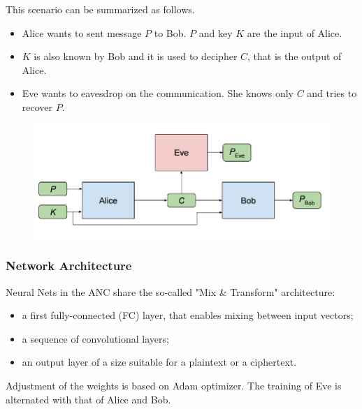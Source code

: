 \documentclass{beamer}
\begin{document}
\begin{frame}
This scenario can be summarized as follows.
\begin{itemize}
\item Alice wants to sent message $P$ to Bob. $P$ and key $K$ are the input of Alice. 
\item $K$ is also known by Bob and it is used to decipher $C$, that is the output of Alice.
\item Eve wants to eavesdrop on the communication. She knows only $C$ and tries to recover $P$.
\end{itemize}
\begin{figure}
\includegraphics[width = \textwidth]{"pictures/anc.png"}
\end{figure}
\end{frame}
\begin{frame}
\frametitle{Network Architecture}
Neural Nets in the ANC share the so-called "Mix \& Transform" architecture:
\begin{itemize}
\item a first fully-connected (FC) layer, that enables mixing between input vectors;
\item a sequence of convolutional layers;
\item an output layer of a size suitable for a plaintext or a ciphertext.
\end{itemize}
Adjustment of the weights is based on Adam optimizer. The training of Eve is alternated with that of Alice and Bob.
\end{frame}
\end{document}

